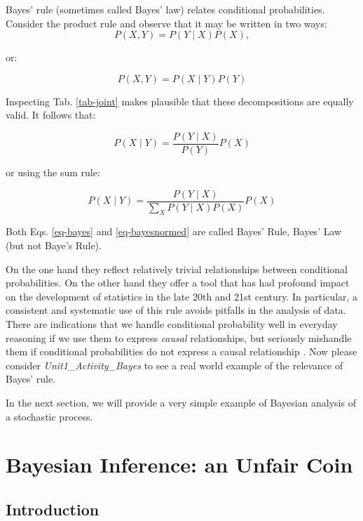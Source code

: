 Bayes' rule (sometimes called Bayes' law) relates conditional probabilities. Consider the product rule and observe that it may be written in two ways:
\begin{equation}
  P(X, Y) = P(Y  \mid X) P(X),
\end{equation}

or:

\begin{equation}
P(X, Y) = P(X \mid Y)P(Y)
\end{equation}

Inspecting Tab. \ref{tab-joint} makes plausible that these decompositions are equally valid.
It follows that:

\begin{equation}
P(X \mid Y) = \frac{P( Y \mid X)}{P(Y)}P(X)
\label{eq-bayes}
\end{equation}

or using the sum rule:

\begin{equation}
P(X \mid Y) = \frac{P (Y \mid X)}{\sum_X P(Y \mid X) P(X)} P(X)
\label{eq-bayesnormed}
\end{equation}

Both Eqs. \ref{eq-bayes} and \ref{eq-bayesnormed} are called Bayes' Rule, Bayes' Law (but not Baye's Rule).

On the one hand they reflect relatively trivial relationships between conditional probabilities. On the other hand they offer a tool that has had profound
impact on the development of statistics in the late 20th and 21st century. In particular, a consistent and systematic use of this rule avoids pitfalls in the analysis
of data. There are indications that we handle conditional probability well in everyday reasoning  if we use them to express \emph{causal} relationships,
but seriously mishandle them
if conditional probabilities do not express a causal relationship \cite{pearl2016,pearl2018}. Now please consider \emph{Unit1\_Activity\_Bayes} to see a real world example of the
relevance of Bayes' rule.

In the next section, we will provide a very simple example of Bayesian analysis of
a stochastic process.

\section{Bayesian Inference: an Unfair Coin}
\subsection{Introduction}

